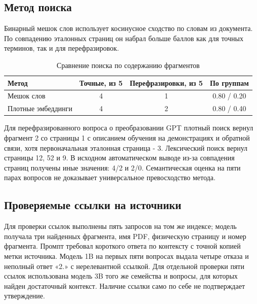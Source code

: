 \documentclass[12pt,a4paper]{article}
\begin{document}
\subsection{Метод поиска}
Бинарный мешок слов использует косинусное сходство по словам из документа. По совпадению эталонных страниц он набрал больше баллов как для точных терминов, так и для перефразировок.
\begin{table}[H]\centering\caption{Сравнение поиска по содержанию фрагментов}\begin{tabular}{lccc}\toprule Метод&Точные, из 5&Перефразировки, из 5&По группам\\\midrule Мешок слов&4&1&0.80 / 0.20\\Плотные эмбеддинги&4&2&0.80 / 0.40\\\bottomrule\end{tabular}\end{table}
Для перефразированного вопроса о преобразовании GPT плотный поиск вернул фрагмент 2 со страницы 1 с описанием обучения на демонстрациях и обратной связи, хотя первоначальная эталонная страница - 3. Лексический поиск вернул страницы 12, 52 и 9. В исходном автоматическом выводе из-за совпадения страниц получены иные значения: 4/2 и 2/0. Семантическая оценка на пяти парах вопросов не доказывает универсальное превосходство метода.

\subsection{Проверяемые ссылки на источники}
Для проверки ссылок выполнены пять запросов на том же индексе; модель получала три найденных фрагмента, имя PDF, физическую страницу и номер фрагмента. Промпт требовал короткого ответа по контексту с точной копией метки источника. Модель 1B на первых пяти вопросах выдала четыре отказа и неполный ответ «2.» с нерелевантной ссылкой. Для отдельной проверки пяти ссылок использована модель 3B того же семейства и вопросы, для которых найден достаточный контекст. Наличие ссылки само по себе не подтверждает утверждение.
\end{document}
